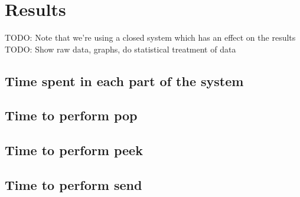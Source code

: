 \documentclass{article}
\begin{document}


    \section{Results}
        TODO: Note that we're using a closed system which has an effect on the results\\
        TODO: Show raw data, graphs, do statistical treatment of data

        \subsection{Time spent in each part of the system}

        \subsection{Time to perform pop}

        \subsection{Time to perform peek}

        \subsection{Time to perform send}
\end{document}

